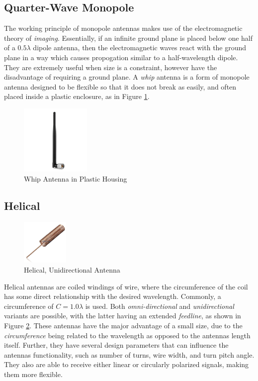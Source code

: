 \subsection{Quarter-Wave Monopole}
The working principle of monopole antennas makes use of the electromagnetic theory of \textit{imaging}. Essentially, if an infinite ground plane is placed below one half of a $0.5 \lambda$ dipole antenna, then the electromagnetic waves react with the ground plane in a way which causes propogation similar to a half-wavelength dipole. They are extremely useful when size is a constraint, however have the disadvantage of requiring a ground plane. A \textit{whip} antenna is a form of monopole antenna designed to be flexible so that it does not break as easily, and often placed inside a plastic enclosure, as in Figure \ref{fig:whip}.

\begin{figure}[!htb]
  \centering
  \includegraphics[width=0.3\textwidth]{whip}
  \caption{Whip Antenna in Plastic Housing}
  \label{fig:whip}
\end{figure}

\subsection{Helical}
\begin{figure}[!htb]
  \centering
  \includegraphics[width=0.2\textwidth]{helical_uni}
  \caption{Helical, Unidirectional Antenna}
  \label{fig:helical_uni}
\end{figure}

Helical antennas are coiled windings of wire, where the circumference of the coil has some direct relationship with the desired wavelength. Commonly, a circumference of $C = 1.0 \lambda$ is used. Both \textit{omni-directional} and \textit{unidirectional} variants are possible, with the latter having an extended \textit{feedline}, as shown in Figure \ref{fig:helical_uni}. These antennas have the major advantage of a small size, due to the \textit{circumference} being related to the wavelength as opposed to the antennas length itself. Further, they have several design parameters that can influence the antennas functionality, such as number of turns, wire width, and turn pitch angle. They also are able to receive either linear or circularly polarized signals, making them more flexible.


